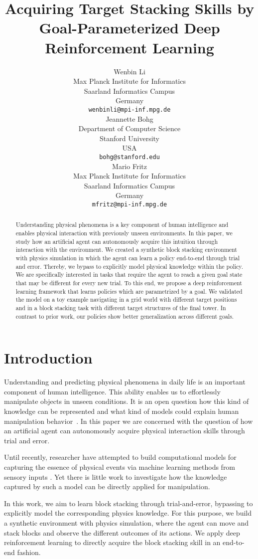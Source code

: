 \documentclass{article} %
\title{Acquiring Target Stacking Skills by Goal-Parameterized Deep Reinforcement Learning}
\author{Wenbin Li \\
Max Planck Institute for Informatics\\
Saarland Informatics Campus\\
Germany \\
\texttt{wenbinli@mpi-inf.mpg.de} \\
\And
Jeannette Bohg \\
Department of Computer Science \\
Stanford University \\
USA \\
\texttt{bohg@stanford.edu} \\
\AND
Mario Fritz \\
Max Planck Institute for Informatics \\
Saarland Informatics Campus\\
Germany \\
\texttt{mfritz@mpi-inf.mpg.de} \\
}
\begin{document}
\maketitle

\begin{abstract}
Understanding physical phenomena is a key component of human intelligence and enables physical interaction with previously unseen environments. In this paper, we study how an artificial agent can autonomously acquire this intuition through interaction with the environment. We created a synthetic block stacking environment with physics simulation in which the agent can learn a policy end-to-end through trial and error. Thereby, we bypass to explicitly model physical knowledge within the policy. We are specifically interested in tasks that require the agent to reach a given goal state that may be different for every new trial. To this end, we propose a deep reinforcement learning framework that learns policies which are parametrized by a goal. We validated the model on a toy example navigating in a grid world with different target positions and in a block stacking task with different target structures of the final tower. In contrast to prior work, our policies show better generalization across different goals.
\end{abstract}

\section{Introduction}
Understanding and predicting physical phenomena in daily life is an important component of human intelligence. This ability enables us to effortlessly manipulate objects in unseen conditions. It is an open question how this kind of knowledge can be represented and what kind of models could explain human manipulation behavior~\citep{yildirim2017physical}. In this paper we are concerned with the question of how an artificial agent can autonomously acquire physical interaction skills through trial and error. 

Until recently, researcher have attempted to build computational models for capturing the essence of physical events via machine learning methods from sensory inputs \citep{mottaghi2015newtonian,wu2015galileo,fragkiadaki2015learning,apratim16ariv,fergus16blocsarxiv,li2016fall}. Yet there is little work to investigate how the knowledge captured by such a model can be directly applied for manipulation.

In this work, we aim to learn block stacking through trial-and-error, bypassing to explicitly model the corresponding physics knowledge. For this purpose, we build a synthetic environment with physics simulation, where the agent can move and stack blocks and observe the different outcomes of its actions. We apply deep reinforcement learning to directly acquire the block stacking skill in an end-to-end fashion.
\end{document}
